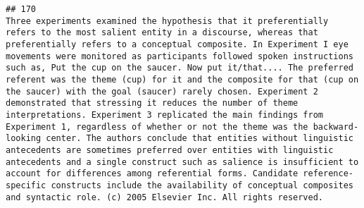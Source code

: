 \documentclass[
  english,
  man]{apa6}
\begin{document}
\begin{verbatim}
## 170                                                                                                                                                                                                                                                                                                                                                                                                                                                                                                                                                                                                                                                                                                                                                                                                                                                                                                                                                                                                                                                                                                                                                                                                                                                                                                                                                                                                                                                                                                                                                        Three experiments examined the hypothesis that it preferentially refers to the most salient entity in a discourse, whereas that preferentially refers to a conceptual composite. In Experiment I eye movements were monitored as participants followed spoken instructions such as, Put the cup on the saucer. Now put it/that.... The preferred referent was the theme (cup) for it and the composite for that (cup on the saucer) with the goal (saucer) rarely chosen. Experiment 2 demonstrated that stressing it reduces the number of theme interpretations. Experiment 3 replicated the main findings from Experiment 1, regardless of whether or not the theme was the backward-looking center. The authors conclude that entities without linguistic antecedents are sometimes preferred over entities with linguistic antecedents and a single construct such as salience is insufficient to account for differences among referential forms. Candidate reference-specific constructs include the availability of conceptual composites and syntactic role. (c) 2005 Elsevier Inc. All rights reserved.

\end{verbatim}
\end{document}
